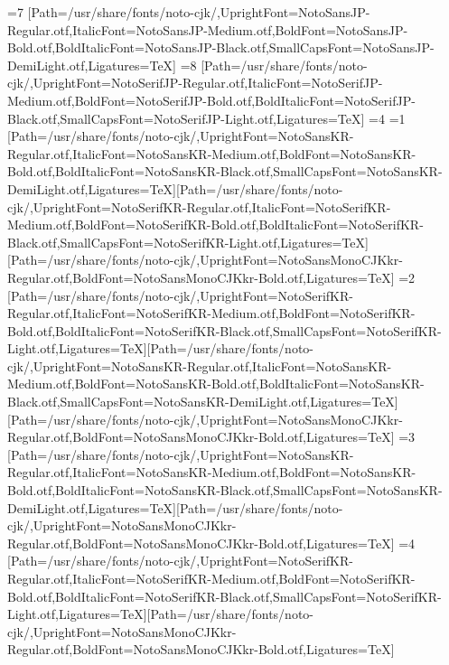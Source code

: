 \else\ifnum\value{CJKFonts}=7
[Path=/usr/share/fonts/noto-cjk/,UprightFont=NotoSansJP-Regular.otf,ItalicFont=NotoSansJP-Medium.otf,BoldFont=NotoSansJP-Bold.otf,BoldItalicFont=NotoSansJP-Black.otf,SmallCapsFont=NotoSansJP-DemiLight.otf,Ligatures=TeX]
\else\ifnum\value{CJKFonts}=8
[Path=/usr/share/fonts/noto-cjk/,UprightFont=NotoSerifJP-Regular.otf,ItalicFont=NotoSerifJP-Medium.otf,BoldFont=NotoSerifJP-Bold.otf,BoldItalicFont=NotoSerifJP-Black.otf,SmallCapsFont=NotoSerifJP-Light.otf,Ligatures=TeX]
\fi\fi\fi\fi\fi\fi\fi\fi\else
\ifnum\value{CJKLanguage}=4
\ifnum\value{CJKFonts}=1
[Path=/usr/share/fonts/noto-cjk/,UprightFont=NotoSansKR-Regular.otf,ItalicFont=NotoSansKR-Medium.otf,BoldFont=NotoSansKR-Bold.otf,BoldItalicFont=NotoSansKR-Black.otf,SmallCapsFont=NotoSansKR-DemiLight.otf,Ligatures=TeX][Path=/usr/share/fonts/noto-cjk/,UprightFont=NotoSerifKR-Regular.otf,ItalicFont=NotoSerifKR-Medium.otf,BoldFont=NotoSerifKR-Bold.otf,BoldItalicFont=NotoSerifKR-Black.otf,SmallCapsFont=NotoSerifKR-Light.otf,Ligatures=TeX][Path=/usr/share/fonts/noto-cjk/,UprightFont=NotoSansMonoCJKkr-Regular.otf,BoldFont=NotoSansMonoCJKkr-Bold.otf,Ligatures=TeX]
\else\ifnum\value{CJKFonts}=2
[Path=/usr/share/fonts/noto-cjk/,UprightFont=NotoSerifKR-Regular.otf,ItalicFont=NotoSerifKR-Medium.otf,BoldFont=NotoSerifKR-Bold.otf,BoldItalicFont=NotoSerifKR-Black.otf,SmallCapsFont=NotoSerifKR-Light.otf,Ligatures=TeX][Path=/usr/share/fonts/noto-cjk/,UprightFont=NotoSansKR-Regular.otf,ItalicFont=NotoSansKR-Medium.otf,BoldFont=NotoSansKR-Bold.otf,BoldItalicFont=NotoSansKR-Black.otf,SmallCapsFont=NotoSansKR-DemiLight.otf,Ligatures=TeX][Path=/usr/share/fonts/noto-cjk/,UprightFont=NotoSansMonoCJKkr-Regular.otf,BoldFont=NotoSansMonoCJKkr-Bold.otf,Ligatures=TeX]
\else\ifnum\value{CJKFonts}=3
[Path=/usr/share/fonts/noto-cjk/,UprightFont=NotoSansKR-Regular.otf,ItalicFont=NotoSansKR-Medium.otf,BoldFont=NotoSansKR-Bold.otf,BoldItalicFont=NotoSansKR-Black.otf,SmallCapsFont=NotoSansKR-DemiLight.otf,Ligatures=TeX][Path=/usr/share/fonts/noto-cjk/,UprightFont=NotoSansMonoCJKkr-Regular.otf,BoldFont=NotoSansMonoCJKkr-Bold.otf,Ligatures=TeX]
\else\ifnum\value{CJKFonts}=4
[Path=/usr/share/fonts/noto-cjk/,UprightFont=NotoSerifKR-Regular.otf,ItalicFont=NotoSerifKR-Medium.otf,BoldFont=NotoSerifKR-Bold.otf,BoldItalicFont=NotoSerifKR-Black.otf,SmallCapsFont=NotoSerifKR-Light.otf,Ligatures=TeX][Path=/usr/share/fonts/noto-cjk/,UprightFont=NotoSansMonoCJKkr-Regular.otf,BoldFont=NotoSansMonoCJKkr-Bold.otf,Ligatures=TeX]
